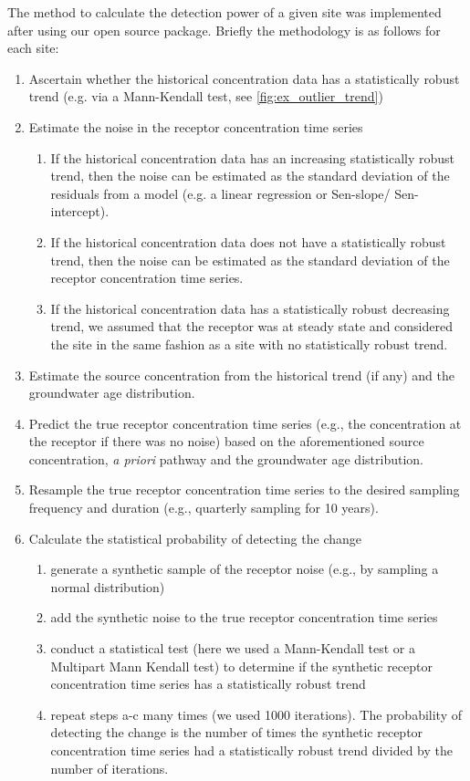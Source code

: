 The method to calculate the detection power of a given site was implemented after %
using our open source package. %
Briefly the methodology is as follows for each site:
\begin{enumerate}
    \item Ascertain whether the historical concentration data has a statistically robust trend (e.g. via a Mann-Kendall test, see \autoref{fig:ex_outlier_trend})
    \item Estimate the noise in the receptor concentration time series
    \begin{enumerate}
        \item If the historical concentration data has an increasing statistically robust trend, then the noise can be estimated as the standard deviation of the residuals from a model (e.g. a linear regression or Sen-slope/ Sen-intercept).
        \item If the historical concentration data does not have a statistically robust trend, then the noise can be estimated as the standard deviation of the receptor concentration time series.
        \item If the historical concentration data has a statistically robust decreasing trend, we assumed that the receptor was at steady state and considered the site in the same fashion as a site with no statistically robust trend.
    \end{enumerate}
    \item Estimate the source concentration from the historical trend (if any) and the groundwater age distribution.
    \item Predict the true receptor concentration time series (e.g., the concentration at the receptor if there was no noise) based on the aforementioned source concentration, \textit{a priori} pathway and the groundwater age distribution.
    \item Resample the true receptor concentration time series to the desired sampling frequency and duration (e.g., quarterly sampling for 10 years).
    \item Calculate the statistical probability of detecting the change
    \begin{enumerate}
        \item generate a synthetic sample of the receptor noise (e.g., by sampling a normal distribution)
        \item add the synthetic noise to the true receptor concentration time series
        \item conduct a statistical test (here we used a Mann-Kendall test or a Multipart Mann Kendall test) to determine if the synthetic receptor concentration time series has a statistically robust trend
        \item repeat steps a-c many times (we used 1000 iterations). The probability of detecting the change is the number of times the synthetic receptor concentration time series had a statistically robust trend divided by the number of iterations.
    \end{enumerate}
\end{enumerate}


